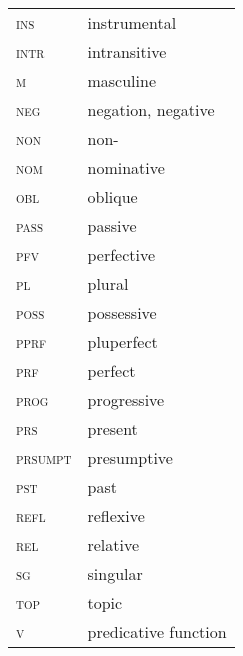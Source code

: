 \documentclass[output=paper]{LSP/langsci}
\begin{document}
\begin{tabularx}{.45\textwidth}{lQ}
\textsc{ins} & instrumental\\
\textsc{intr} & intransitive\\
\textsc{m} & masculine\\
\textsc{neg} & negation, negative\\
\textsc{non} & non-\\
\textsc{nom} & nominative\\
\textsc{obl} & oblique\\
\textsc{pass} & passive\\
\textsc{pfv} & perfective\\
\textsc{pl} & plural\\
\textsc{poss} & possessive\\
\textsc{pprf} & pluperfect\\
\textsc{prf} & perfect\\
\textsc{prog} & progressive\\
\textsc{prs} & present\\
\textsc{prsumpt} & presumptive\\
\textsc{pst} & past\\
\textsc{refl} & reflexive\\
\textsc{rel} & relative\\
\textsc{sg} & singular\\
\textsc{top} & topic\\
\textsc{v} & predicative function\\
\end{tabularx} 

{\sloppy
\printbibliography[heading=subbibliography,notkeyword=this] }
\end{document}
